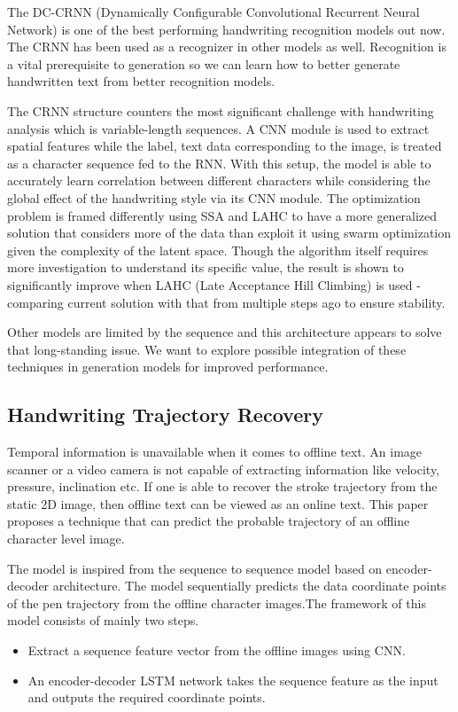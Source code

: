 \documentclass[10pt,twocolumn,letterpaper]{article}
\begin{document}
The DC-CRNN (Dynamically Configurable Convolutional Recurrent Neural Network) \cite{crnn} is one of the best performing handwriting recognition models out now. The CRNN has been used as a recognizer in other models as well. Recognition is a vital prerequisite to generation so we can learn how to better generate handwritten text from better recognition models.

The CRNN structure counters the most significant challenge with handwriting analysis which is variable-length sequences. A CNN module is used to extract spatial features while the label, text data corresponding to the image, is treated as a character sequence fed to the RNN. With this setup, the model is able to accurately learn correlation between different characters while considering the global effect of the handwriting style via its CNN module. The optimization problem is framed differently using SSA and LAHC to have a more generalized solution that considers more of the data than exploit it using swarm optimization given the complexity of the latent space. Though the algorithm itself requires more investigation to understand its specific value, the result is shown to significantly improve when LAHC (Late Acceptance Hill Climbing) is used - comparing current solution with that from multiple steps ago to ensure stability.

Other models are limited by the sequence and this architecture appears to solve that long-standing issue. We want to explore possible integration of these techniques in generation models for improved performance.

\subsection{Handwriting Trajectory Recovery}
\label{subsec: img2stroke}
Temporal information is unavailable when it comes to offline text. An image scanner or a video camera is not capable of extracting information like velocity, pressure, inclination etc. If one is able to recover the stroke trajectory from the static 2D image, then offline text can be viewed as an online text. This paper \cite{image2stroke-1Char} proposes a technique that can predict the probable trajectory of an offline character level image.

The model is inspired from the sequence to sequence model based on encoder-decoder architecture. The model sequentially predicts the data coordinate points of the pen trajectory from the offline character images.The framework of this model consists of mainly two steps.
\begin{itemize}
    \item Extract a sequence feature vector from the offline images using CNN.
    \item  An encoder-decoder LSTM network takes the sequence feature as the input and outputs the required coordinate points.
\end{itemize}
\end{document}
